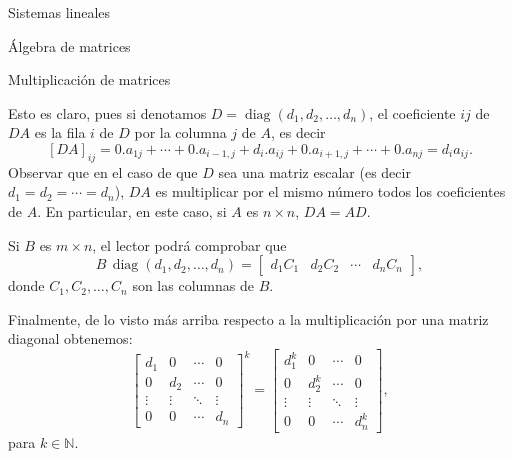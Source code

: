 \begin{chapter}{Sistemas lineales}
\begin{section}{\'Algebra de matrices}
\begin{subsection}{Multiplicaci\'on de matrices}
\begin{observacion}
\begin{equation*}
                \end{equation*}
                Esto es claro, pues si denotamos $D = \operatorname{diag}(d_1,d_2,\ldots,d_n)$, el coeficiente $ij$  de $DA$ es la fila $i$ de $D$ por la columna $j$ de $A$, es decir
                $$
                [DA]_{ij} = 0.a_{1j}+\cdots + 0.a_{i-1,j}+d_i.a_{ij}+0.a_{i+1,j}+\cdots + 0.a_{nj} = d_ia_{ij}. 
                $$
                Observar que en el caso de que $D$ sea una matriz escalar (es decir $d_1=d_2=\cdots=d_n$), $DA$ es multiplicar por el mismo número todos los coeficientes de $A$. En particular, en este caso, si $A$  es $n \times n$,  $DA = AD$.
                 
                
                
                 Si $B$ es $m \times n$, el lector podrá comprobar que 
                 \begin{equation*}
                     B\,\operatorname{diag}(d_1,d_2,\ldots,d_n) = \begin{bmatrix}
                         d_1C_1& d_2C_2& \cdots &d_nC_n
                     \end{bmatrix},
                 \end{equation*} 
                 donde $C_1,C_2,\ldots,C_n$ son las columnas de $B$.
                 
                 Finalmente,  de lo visto más arriba respecto a la multiplicación por una matriz diagonal obtenemos:
                 \begin{equation*}
                    \begin{bmatrix}
                        d_1 & 0 & \cdots &0 \\
                        0 & d_2 & \cdots &0 \\
                        \vdots & \vdots & \ddots &\vdots \\
                        0 & 0 & \cdots & d_n 
                        \end{bmatrix}^k =
                        \begin{bmatrix}
                            d_1^k & 0 & \cdots &0 \\
                            0 & d_2^k & \cdots &0 \\
                            \vdots & \vdots & \ddots &\vdots \\
                            0 & 0 & \cdots & d_n^k 
                            \end{bmatrix} ,
                 \end{equation*}
                 para $k \in \mathbb N$.
                

\end{observacion}
\end{subsection}
\end{section}
\end{chapter}
